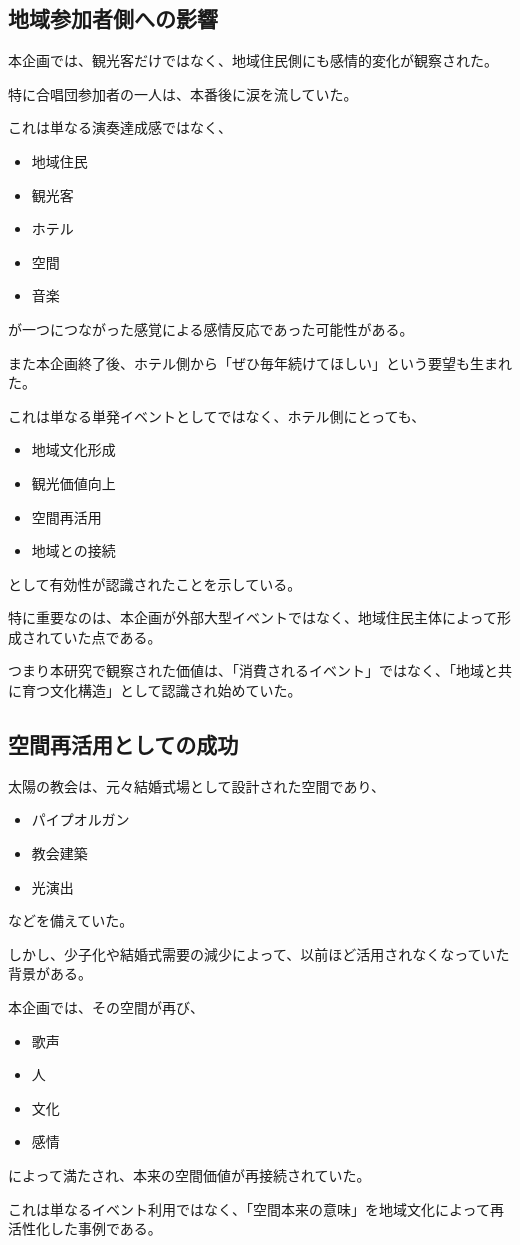 \subsection{地域参加者側への影響}

本企画では、観光客だけではなく、地域住民側にも感情的変化が観察された。

特に合唱団参加者の一人は、本番後に涙を流していた。

これは単なる演奏達成感ではなく、

\begin{itemize}
\item 地域住民
\item 観光客
\item ホテル
\item 空間
\item 音楽
\end{itemize}

が一つにつながった感覚による感情反応であった可能性がある。

また本企画終了後、ホテル側から「ぜひ毎年続けてほしい」という要望も生まれた。

これは単なる単発イベントとしてではなく、ホテル側にとっても、

\begin{itemize}
\item 地域文化形成
\item 観光価値向上
\item 空間再活用
\item 地域との接続
\end{itemize}

として有効性が認識されたことを示している。

特に重要なのは、本企画が外部大型イベントではなく、地域住民主体によって形成されていた点である。

つまり本研究で観察された価値は、「消費されるイベント」ではなく、「地域と共に育つ文化構造」として認識され始めていた。


\subsection{空間再活用としての成功}

太陽の教会は、元々結婚式場として設計された空間であり、

\begin{itemize}
\item パイプオルガン
\item 教会建築
\item 光演出
\end{itemize}

などを備えていた。

しかし、少子化や結婚式需要の減少によって、以前ほど活用されなくなっていた背景がある。

本企画では、その空間が再び、

\begin{itemize}
\item 歌声
\item 人
\item 文化
\item 感情
\end{itemize}

によって満たされ、本来の空間価値が再接続されていた。

これは単なるイベント利用ではなく、「空間本来の意味」を地域文化によって再活性化した事例である。
